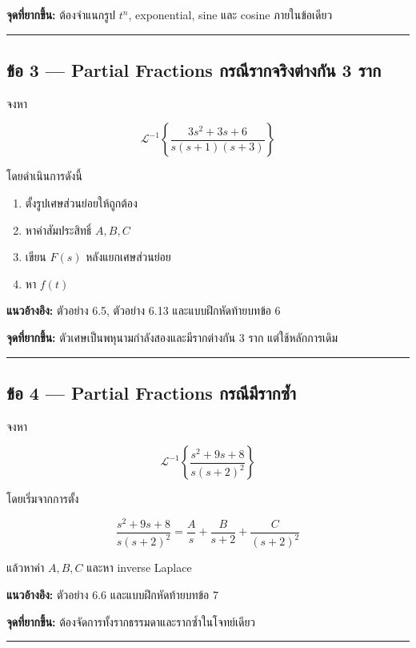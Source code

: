 \textbf{จุดที่ยากขึ้น:} ต้องจำแนกรูป \(t^n\), exponential, sine และ cosine ภายในข้อเดียว

\par\noindent\rule{\textwidth}{0.4pt}\par

\subsection{ข้อ 3 — Partial Fractions กรณีรากจริงต่างกัน 3 ราก}

จงหา

\[
\mathcal{L}^{-1}
\left\{
\frac{3s^2+3s+6}
{s(s+1)(s+3)}
\right\}
\]

โดยดำเนินการดังนี้

\begin{enumerate}
    \item ตั้งรูปเศษส่วนย่อยให้ถูกต้อง
    \item หาค่าสัมประสิทธิ์ \(A,B,C\)
    \item เขียน \(F(s)\) หลังแยกเศษส่วนย่อย
    \item หา \(f(t)\)
\end{enumerate}

\textbf{แนวอ้างอิง:} ตัวอย่าง 6.5, ตัวอย่าง 6.13 และแบบฝึกหัดท้ายบทข้อ 6

\textbf{จุดที่ยากขึ้น:} ตัวเศษเป็นพหุนามกำลังสองและมีรากต่างกัน 3 ราก แต่ใช้หลักการเดิม

\par\noindent\rule{\textwidth}{0.4pt}\par

\subsection{ข้อ 4 — Partial Fractions กรณีมีรากซ้ำ}

จงหา

\[
\mathcal{L}^{-1}
\left\{
\frac{s^2+9s+8}
{s(s+2)^2}
\right\}
\]

โดยเริ่มจากการตั้ง

\[
\frac{s^2+9s+8}{s(s+2)^2}
=
\frac{A}{s}
+
\frac{B}{s+2}
+
\frac{C}{(s+2)^2}
\]

แล้วหาค่า \(A,B,C\) และหา inverse Laplace

\textbf{แนวอ้างอิง:} ตัวอย่าง 6.6 และแบบฝึกหัดท้ายบทข้อ 7

\textbf{จุดที่ยากขึ้น:} ต้องจัดการทั้งรากธรรมดาและรากซ้ำในโจทย์เดียว

\par\noindent\rule{\textwidth}{0.4pt}\par

